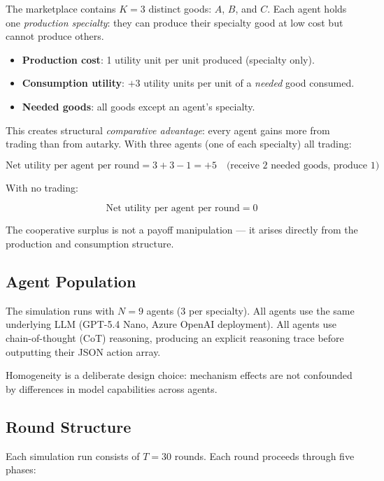 \documentclass[12pt, a4paper]{article}
\begin{document}
The marketplace contains $K = 3$ distinct goods: $A$, $B$, and $C$. Each agent holds one \textit{production specialty}: they can produce their specialty good at low cost but cannot produce others.

\begin{itemize}
  \item \textbf{Production cost}: 1 utility unit per unit produced (specialty only).
  \item \textbf{Consumption utility}: $+3$ utility units per unit of a \textit{needed} good consumed.
  \item \textbf{Needed goods}: all goods except an agent's specialty.
\end{itemize}

This creates structural \textit{comparative advantage}: every agent gains more from trading than from autarky. With three agents (one of each specialty) all trading:

\[
\text{Net utility per agent per round} = 3 + 3 - 1 = +5 \quad \text{(receive 2 needed goods, produce 1)}
\]

With no trading:

\[
\text{Net utility per agent per round} = 0
\]

The cooperative surplus is not a payoff manipulation — it arises directly from the production and consumption structure.

\subsection{Agent Population}

The simulation runs with $N = 9$ agents (3 per specialty). All agents use the same underlying LLM (GPT-5.4 Nano, Azure OpenAI deployment). All agents use chain-of-thought (CoT) reasoning, producing an explicit reasoning trace before outputting their JSON action array.

Homogeneity is a deliberate design choice: mechanism effects are not confounded by differences in model capabilities across agents.

\subsection{Round Structure}

Each simulation run consists of $T = 30$ rounds. Each round proceeds through five phases:
\end{document}
